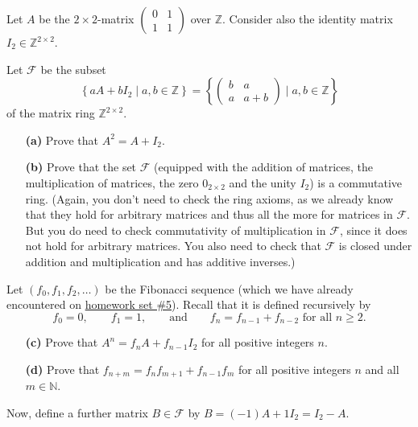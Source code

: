\documentclass[paper=a4, fontsize=12pt]{scrartcl}%
\theoremstyle{plainsl}
\theoremstyle{definition}
\theoremstyle{remark}
\begin{document}
Let $A$ be the $2 \times2$-matrix $%
\begin{pmatrix}
0 & 1\\
1 & 1
\end{pmatrix}
$ over $\mathbb{Z}$. Consider also the identity matrix $I_{2}
\in \mathbb{Z}^{2 \times 2}$.

Let $\mathcal{F}$ be the subset
\[
\left\{  aA+bI_{2}\mid a,b\in\mathbb{Z}\right\}  =\left\{
\begin{pmatrix}
b & a\\
a & a+b
\end{pmatrix}
\mid a,b\in\mathbb{Z}\right\}
\]
of the matrix ring $\mathbb{Z}^{2\times2}$.

\begin{enumerate}
\item[\textbf{(a)}] Prove that $A^{2} = A + I_{2}$.

\item[\textbf{(b)}] Prove that the set $\mathcal{F}$ (equipped with the
addition of matrices, the multiplication of matrices, the zero $0_{2 \times2}$
and the unity $I_{2}$) is a commutative ring. \newline(Again, you don't need
to check the ring axioms, as we already know that they hold for arbitrary
matrices and thus all the more for matrices in $\mathcal{F}$. But you do need
to check commutativity of multiplication in $\mathcal{F}$, since it does not
hold for arbitrary matrices. You also need to check that $\mathcal{F}$ is
closed under addition and multiplication and has additive inverses.)
\end{enumerate}

Let $\left(  f_{0},f_{1},f_{2},\ldots\right)  $ be the Fibonacci sequence
(which we have already encountered on
\href{http://www.cip.ifi.lmu.de/~grinberg/t/19s/hw5s.pdf}{homework set
\#5}). Recall that it is defined recursively by
\[
f_{0}=0,\qquad f_{1}=1,\qquad\text{and}\qquad f_{n}=f_{n-1}+f_{n-2}\text{ for
all }n\geq2.
\]


\begin{enumerate}
\item[\textbf{(c)}] Prove that $A^{n} = f_{n} A + f_{n-1} I_{2}$ for all
positive integers $n$.

\item[\textbf{(d)}] Prove that $f_{n+m}=f_{n}f_{m+1}+f_{n-1}f_{m}$ for all
positive integers $n$ and all $m\in\mathbb{N}$.
\end{enumerate}

Now, define a further matrix $B \in\mathcal{F}$ by $B = \left(  -1 \right)  A
+ 1I_{2} = I_{2} - A$.
\end{document}
